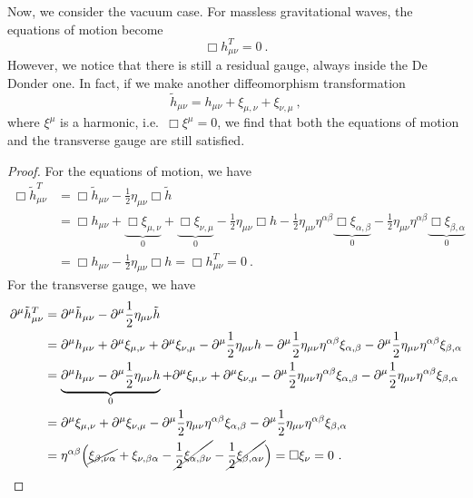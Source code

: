     Now, we consider the vacuum case. For massless gravitational waves, the equations of motion become
    \begin{equation*}
        \Box h^T_{\mu\nu} = 0 ~.
    \end{equation*}
    However, we notice that there is still a residual gauge, always inside the De Donder one. In fact, if we make another diffeomorphism transformation
    \begin{equation*}
        \tilde h_{\mu\nu} = h_{\mu\nu} + \xi_{\mu,\nu} + \xi_{\nu,\mu} ~,
    \end{equation*}
    where $\xi^\mu$ is a harmonic, i.e.~$\Box \xi^\mu = 0$, we find that both the equations of motion and the transverse gauge are still satisfied.
    \begin{proof}
        For the equations of motion, we have 
        \begin{equation*}
        \begin{aligned}
            \Box \tilde h^T_{\mu\nu} & = \Box \tilde h_{\mu\nu} - \frac{1}{2} \eta_{\mu\nu} \Box \tilde h \\ & = \Box h_{\mu\nu} + \underbrace{\Box \xi_{\mu,\nu}}_0 + \underbrace{\Box \xi_{\nu,\mu}}_0 - \frac{1}{2} \eta_{\mu\nu} \Box h - \frac{1}{2} \eta_{\mu\nu} \eta^{\alpha\beta} \underbrace{\Box \xi_{\alpha,\beta}}_0 - \frac{1}{2} \eta_{\mu\nu} \eta^{\alpha\beta} \underbrace{\Box \xi_{\beta,\alpha}}_0 \\ & = \Box h_{\mu\nu} - \frac{1}{2} \eta_{\mu\nu} \Box h = \Box h^T_{\mu\nu} = 0 ~.
        \end{aligned}
        \end{equation*}
        For the transverse gauge, we have 
        \begin{equation*}
        \begin{aligned}
            \partial^\mu \tilde h^T_{\mu\nu} & = \partial^\mu \tilde h_{\mu\nu} - \partial^\mu \frac{1}{2} \eta_{\mu\nu} \tilde h \\ & = \partial^\mu h_{\mu\nu} + \partial^\mu \xi_{\mu,\nu} + \partial^\mu \xi_{\nu,\mu} - \partial^\mu \frac{1}{2} \eta_{\mu\nu} h - \partial^\mu \frac{1}{2} \eta_{\mu\nu} \eta^{\alpha\beta} \xi_{\alpha,\beta} - \partial^\mu \frac{1}{2} \eta_{\mu\nu} \eta^{\alpha\beta} \xi_{\beta,\alpha} \\ & = \underbrace{ \partial^\mu h_{\mu\nu} - \partial^\mu \frac{1}{2} \eta_{\mu\nu} h }_0 + \partial^\mu \xi_{\mu,\nu} + \partial^\mu \xi_{\nu,\mu} - \partial^\mu \frac{1}{2} \eta_{\mu\nu} \eta^{\alpha\beta} \xi_{\alpha,\beta} - \partial^\mu \frac{1}{2} \eta_{\mu\nu} \eta^{\alpha\beta} \xi_{\beta,\alpha} \\ & = \partial^\mu \xi_{\mu,\nu} + \partial^\mu \xi_{\nu,\mu} - \partial^\mu \frac{1}{2} \eta_{\mu\nu} \eta^{\alpha\beta} \xi_{\alpha,\beta} - \partial^\mu \frac{1}{2} \eta_{\mu\nu} \eta^{\alpha\beta} \xi_{\beta,\alpha} \\ & = \eta^{\alpha\beta} \Big ( \cancel{\xi_{\beta,\nu\alpha}} + \xi_{\nu,\beta\alpha} -  \cancel{\frac{1}{2} \xi_{\alpha,\beta\nu}} - \cancel{\frac{1}{2} \xi_{\beta,\alpha\nu}} \Big ) = \Box \xi_\nu = 0 ~.
        \end{aligned}
        \end{equation*}
    \end{proof}

